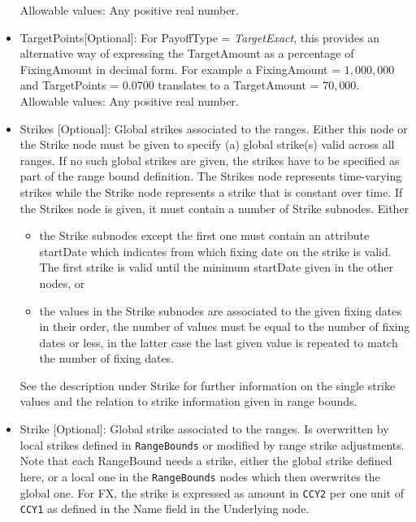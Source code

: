 \begin{itemize}
      Allowable values: Any positive real number.

    \item TargetPoints[Optional]: For PayoffType = \emph{TargetExact}, this provides an alternative way of expressing
      the TargetAmount as a percentage of FixingAmount in decimal form. For example a FixingAmount = $1,000,000$ and
      TargetPoints = $0.0700$ translates to a TargetAmount = $70,000$. \\

      Allowable values: Any positive real number.

    \item Strikes [Optional]: Global strikes associated to the ranges. Either this node or the Strike node must be given
      to specify (a) global strike(s) valid across all ranges. If no such global strikes are given, the strikes have to
      be specified as part of the range bound definition.  The Strikes node represents time-varying strikes while the
      Strike node represents a strike that is constant over time. If the Strikes node is given, it must contain a number
      of Strike subnodes. Either
     \begin{itemize}
       \item the Strike subnodes except the first one must contain an attribute startDate which indicates from which
         fixing date on the strike is valid. The first strike is valid until the minimum startDate given in the other
         nodes, or
       \item the values in the Strike subnodes are associated to the given fixing dates in their order, the number of
         values must be equal to the number of fixing dates or less, in the latter case the last given value is repeated
         to match the number of fixing dates.
     \end{itemize}
     See the description under Strike for further information on the single strike values and the relation to strike
     information given in range bounds.

    \item Strike [Optional]: Global strike associated to the ranges. Is overwritten by local strikes defined in
      \lstinline!RangeBounds! or modified by range strike adjustments. Note that each RangeBound needs a strike, either
      the global strike defined here, or a local one in the \lstinline!RangeBounds! nodes which then overwrites the
      global one. For FX, the strike is expressed as amount in \lstinline!CCY2! per one unit of \lstinline!CCY1! as
      defined in the Name field in the Underlying node.
    

\end{itemize}
